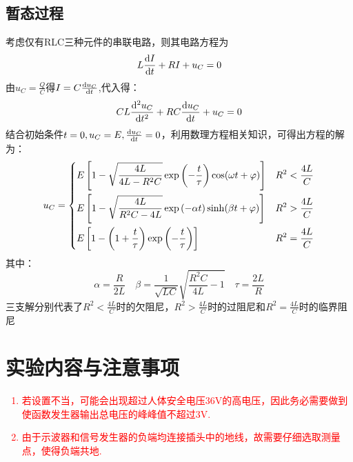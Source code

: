 \documentclass[11pt]{article}
\begin{document}
\subsection{暂态过程}
考虑仅有RLC三种元件的串联电路，则其电路方程为
\begin{equation}
	L\dv{I}{t}+RI+u_C=0
\end{equation}
由\(u_C=\frac{Q}{C}\)得\(I=C\dv{u_C}{t}\),代入得：
\begin{equation}
	CL\dv[2]{u_C}{t}+RC\dv{u_C}{t}+u_C=0
\end{equation}
结合初始条件\(t=0,u_C=E,\dv{u_C}{t}=0\)，利用数理方程相关知识，可得出方程的解为：
\[
u_C = \begin{dcases}
	E\left[ 1 - \sqrt{\frac{4L}{4L - R^2C}} \exp\left( -\frac{t}{\tau}\right) \cos(\omega t+\varphi) \right]& R^2 < \frac{4L}{C}\\
	E\left[ 1 - \sqrt{\frac{4L}{R^2C - 4L}} \exp\left( -\alpha t\right) \sinh(\beta t+\varphi)\right] & R^2 >\frac{4L}{C}\\
	E\left[ 1 - \left(1+\frac{t}{\tau}\right) \exp \left( -\frac{t}{\tau}\right) \right] & R^2 =\frac{4L}{C}
\end{dcases}
\]
其中：
\[\alpha=\frac{R}{2L} \quad \beta=\frac{1}{\sqrt{LC}} \sqrt{\frac{R^2 C}{4L}-1} \quad \tau=\frac{2L}{R}
\]
三支解分别代表了\(R^2 < \frac{4L}{C}\)时的欠阻尼，\(R^2 >\frac{4L}{C}\)时的过阻尼和\(R^2 =\frac{4L}{C}\)时的临界阻尼



\section{实验内容与注意事项}

\textcolor{red}{
	\begin{enumerate}
		\item 若设置不当，可能会出现超过人体安全电压36V的高电压，因此务必需要做到使函数发生器输出总电压的峰峰值不超过3V.
		\item 由于示波器和信号发生器的负端均连接插头中的地线，故需要仔细选取测量点，使得负端共地.
	\end{enumerate}
}
\end{document}
